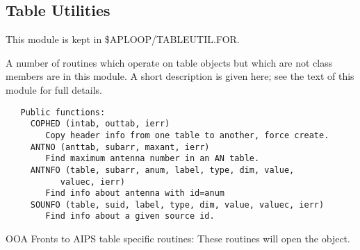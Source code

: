 \subsection {Table Utilities}


   This module is kept in \$APLOOP/TABLEUTIL.FOR.

   A number of routines which operate on table objects but which are
not class members are in this module.  A short description
is given here; see the text of this module for full details.
{\small\begin{verbatim}
   Public functions:
     COPHED (intab, outtab, ierr)
        Copy header info from one table to another, force create.
     ANTNO (anttab, subarr, maxant, ierr)
        Find maximum antenna number in an AN table.
     ANTNFO (table, subarr, anum, label, type, dim, value,
           valuec, ierr)
        Find info about antenna with id=anum
     SOUNFO (table, suid, label, type, dim, value, valuec, ierr)
        Find info about a given source id.

\end{verbatim}}

  OOA Fronts to AIPS table specific routines:
These routines will open the object.


